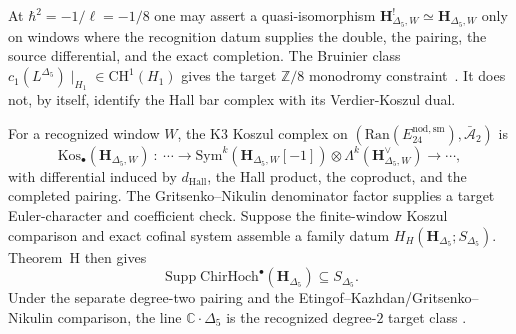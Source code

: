\begin{remark}[Conditional self-Koszulness at $\hbar^2 = -1/8$]
\label{rem:ckp-deep-2}
At $\hbar^2=-1/\ell=-1/8$ one may assert a quasi-isomorphism
$\mathbf H^!_{\Delta_5,W}\simeq\mathbf H_{\Delta_5,W}$ only on windows
where the recognition datum supplies the double, the pairing, the source
differential, and the exact completion.  The Bruinier class
$c_1(L^{\Delta_5})\mid_{H_1}\in\mathrm{CH}^1(H_1)$ gives the target
$\mathbb Z/8$ monodromy constraint~\cite{Bruinier2002}.  It does not, by
itself, identify the Hall bar complex with its Verdier-Koszul dual.
\end{remark}

\begin{remark}
\label{rem:ckp-deep-3}
For a recognized window $W$, the K3 Koszul complex on
$(\mathrm{Ran}(E^{\mathrm{nod,sm}}_{24}),\bar{\mathcal A}_2)$ is
\[
\mathrm{Kos}_\bullet(\mathbf H_{\Delta_5,W})\ :\
\dotsb\to
\mathrm{Sym}^k(\mathbf H_{\Delta_5,W}[-1])
\otimes\Lambda^k(\mathbf H_{\Delta_5,W}^\vee)\to\dotsb ,
\]
with differential induced by $d_{\mathrm{Hall}}$, the Hall product, the
coproduct, and the completed pairing.  The Gritsenko--Nikulin
denominator factor supplies a target Euler-character and coefficient
check.  Suppose the finite-window Koszul comparison and exact cofinal
system assemble a family datum
$H_H(\mathbf H_{\Delta_5};S_{\Delta_5})$.  Theorem~H then gives
\[
 \operatorname{Supp}\mathrm{ChirHoch}^\bullet
 ( \mathbf H_{\Delta_5})\subseteq S_{\Delta_5}.
\]
Under the separate degree-two pairing and the
Etingof--Kazhdan/Gritsenko--Nikulin comparison, the line
$\mathbb C\cdot\Delta_5$ is the recognized degree-$2$ target class
\cite{EtingofKazhdan2007PartV,GritsenkoNikulin1998}.
\end{remark}
